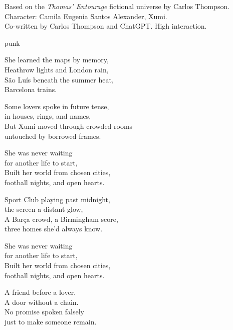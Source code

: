 

\begin{notes}
Based on the \emph{Thomas’ Entourage} fictional universe by Carlos Thompson.\\
Character: Camila Eugenia Santos Alexander, Xumi.\\
Co-written by Carlos Thompson and ChatGPT. %
High interaction.
\end{notes}

\begin{style}
punk
\end{style}

\begin{lyrics}

She learned the maps by memory,\\
Heathrow lights and London rain,\\
São Luís beneath the summer heat,\\
Barcelona trains.

Some lovers spoke in future tense,\\
in houses, rings, and names,\\
But Xumi moved through crowded rooms\\
untouched by borrowed frames.

She was never waiting\\
for another life to start,\\
Built her world from chosen cities,\\
football nights, and open hearts.

Sport Club playing past midnight,\\
the screen a distant glow,\\
A Barça crowd, a Birmingham score,\\
three homes she’d always know.

She was never waiting\\
for another life to start,\\
Built her world from chosen cities,\\
football nights, and open hearts.

A friend before a lover.\\
A door without a chain.\\
No promise spoken falsely\\
just to make someone remain.


\end{lyrics}
